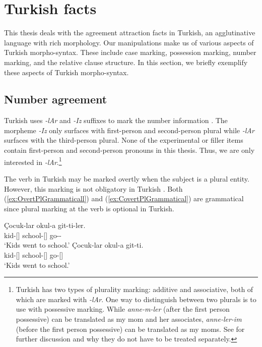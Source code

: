 \section{Turkish facts}

This thesis deals with the agreement attraction facts in Turkish, an agglutinative language with rich morphology. Our manipulations make us of various aspects of Turkish morpho-syntax. These include case marking, possession marking, number marking, and the relative clause structure. In this section, we briefly exemplify these aspects of Turkish morpho-syntax.

\subsection{Number agreement}

Turkish uses \textit{-lAr} and \textit{-Iz} suffixes to mark the number information \citep{GokselKerslake2005}. The morpheme \textit{-Iz} only surfaces with first-person and second-person plural while \textit{-lAr} surfaces with the third-person plural. None of the experimental or filler items contain first-person and second-person pronouns in this thesis. Thus, we are only interested in \textit{-lAr}.\footnote{Turkish has two types of plurality marking: additive and associative, both of which are marked with \emph{-lAr}. One way to distinguish between two plurals is to use with possessive marking. While \emph{anne-m-ler} (after the first person possessive) can be translated as my mom and her associates, \emph{anne-ler-im} (before the first person possessive) can be translated as my moms. See  for further discussion and why they do not have to be treated separately.}

The verb in Turkish may be marked overtly when the subject is a plural entity. However, this marking is not obligatory in Turkish \citep{GokselKerslake2005}. Both (\ref{ex:OvertPlGrammaticall}) and (\ref{ex:CovertPlGrammatical}) are grammatical since plural marking at the verb is optional in Turkish. 

\ea \label{ex:TurkishPluralOptionality}
  \ea \label{ex:OvertPlGrammaticall}
    \gll \c{C}ocuk-lar okul-a git-ti-ler.\\
    kid-\Pl{}[\Nom{}] school-\Dat{}[\Sg{}] go-\Pst{}-\Tpl{}\\
    \glt `Kids went to school.'
  \ex \label{ex:CovertPlGrammatical}
    \gll \c{C}ocuk-lar okul-a git-ti.\\
    kid-\Pl{}[\Nom{}] school-\Dat{}[\Sg{}] go-\Pst{}[\Tpl{}]\\
    \glt `Kids went to school.'
  \z
\z


